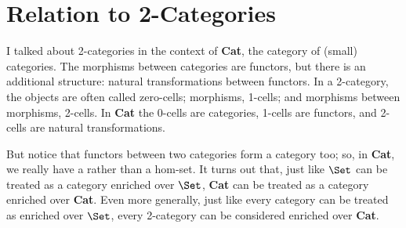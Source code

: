 \section{Relation to 2-Categories}\label{relation-to-2-categories}

I talked about 2-categories in the context of \textbf{Cat}, the category
of (small) categories. The morphisms between categories are functors,
but there is an additional structure: natural transformations between
functors. In a 2-category, the objects are often called zero-cells;
morphisms, 1-cells; and morphisms between morphisms, 2-cells. In
\textbf{Cat} the 0-cells are categories, 1-cells are functors, and
2-cells are natural transformations.

But notice that functors between two categories form a category too; so,
in \textbf{Cat}, we really have a  rather than a
hom-set. It turns out that, just like $\Set$ can be treated as a
category enriched over $\Set$, \textbf{Cat} can be treated as a
category enriched over \textbf{Cat}. Even more generally, just like
every category can be treated as enriched over $\Set$, every
2-category can be considered enriched over \textbf{Cat}.